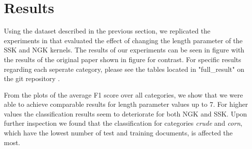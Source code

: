 \section{Results} \label{sec:results}
Using the dataset described in the previous section, we replicated the experiments in \cite{ssk} that evaluated the effect of changing the length parameter of the SSK and NGK kernels. The results of our experiments can be seen in figure \label{plot1} with the results of the original paper shown in figure \label{plot2} for contrast. For specific results regarding each seperate category, please see the tables located in "full_result" on the git repository \citep{git}.

From the plots of the average F1 score over all categories, we show that we were able to achieve comparable results for length parameter values up to 7. For higher values the classification results seem to deteriorate for both NGK and SSK. Upon further inspection we found that the classification for categories \textit{crude} and \textit{corn}, which have the lowest number of test and training documents, is affected the most. 
